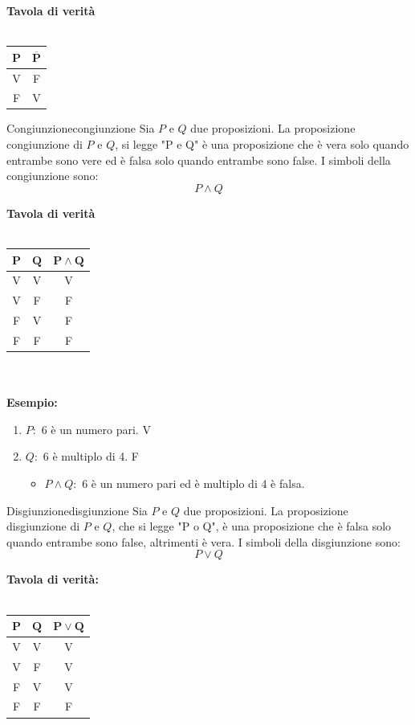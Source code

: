 \documentclass[12pt, letterpaper]{report}
\newcounter{definition}
\newcommand{\nmu}{}
\begin{document}
	\textbf{Tavola di verità}
	\\
	\\
	\begin{tabular} {c|c}
		$\mathbf{P}$ & $\mathbf{\overline P}$ \\
		\hline
		V & F \\
		F & V \\
	\end{tabular}

	\begin{definition}{\nmu Congiunzione}{congiunzione}
		Sia $P$ e $Q$ due proposizioni. La proposizione congiunzione di $P$ e $Q$, si legge "P e Q" è una proposizione che è vera solo quando entrambe sono vere ed è falsa solo quando entrambe sono false.
		I simboli della congiunzione sono:
		\[
		P \wedge Q
		\]
	\end{definition}
	\textbf{Tavola di verità}
	\\
	\\
	\begin{tabular}{c|c|c}
		$\mathbf{P}$ & $\mathbf{Q}$ & $\mathbf{P \wedge Q}$ \\
		\hline
		V & V & V\\
		V & F & F\\
		F & V & F\\
		F & F & F\\
	\end{tabular}
	\\
	\\
	\textbf{Esempio: }
	\begin{enumerate}
		\item $P:$ 6 è un numero pari. V
		\item $Q:$ 6 è multiplo di 4. F
		\begin{itemize}
			\item $P \wedge Q: $ 6 è un numero pari ed è multiplo di 4 è falsa.
		\end{itemize}
	\end{enumerate}
	\begin{definition}{\nmu Disgiunzione}{disgiunzione}
		Sia $P$ e $Q$ due proposizioni. La proposizione disgiunzione di $P$ e $Q$, che si legge "P o Q", è una proposizione che è falsa solo quando entrambe sono false, altrimenti è vera.
		I simboli della disgiunzione sono:
		\[
		P \vee Q
		\]
	\end{definition}
	\textbf{Tavola di verità:}
	\\
	\\
	\begin{tabular}{c|c|c}
		$\mathbf{P}$ & $\mathbf{Q}$ & $\mathbf{P \vee Q}$ \\
		\hline
		V & V & V \\
		V & F & V \\
		F & V & V \\
		F & F & F \\
	\end{tabular}
\end{document}

